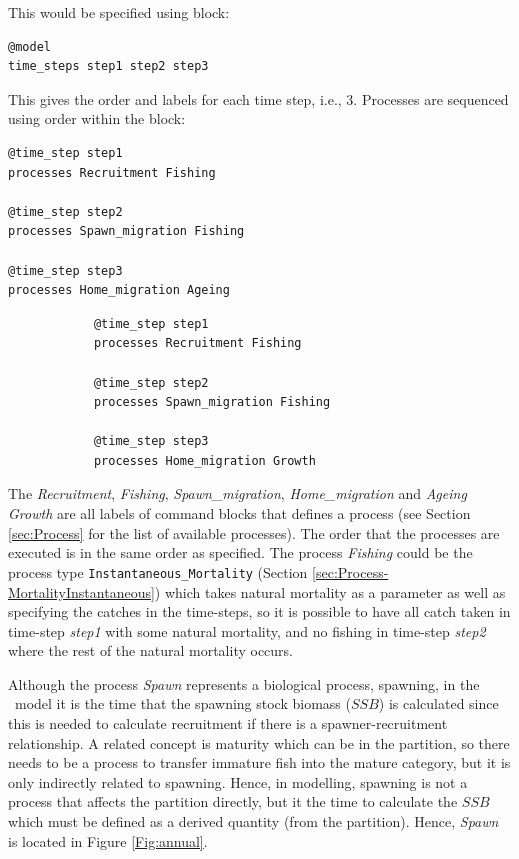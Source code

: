 This would be specified using  block:

{\small{\begin{verbatim}
@model
time_steps step1 step2 step3
\end{verbatim}}}

This gives the order and labels for each time step, i.e., 3. Processes are sequenced using order within the  block:

\ifAgeBased
{\small{\begin{verbatim}
@time_step step1
processes Recruitment Fishing

@time_step step2
processes Spawn_migration Fishing

@time_step step3
processes Home_migration Ageing
\end{verbatim}}}
\else
{\small{\begin{verbatim}
			@time_step step1
			processes Recruitment Fishing
			
			@time_step step2
			processes Spawn_migration Fishing
			
			@time_step step3
			processes Home_migration Growth
\end{verbatim}}}
\fi

The \emph{Recruitment}, \emph{Fishing}, \emph{Spawn\_migration}, \emph{Home\_migration} and \ifAgeBased \emph{Ageing} \else \emph{Growth} \fi are all labels of command blocks that defines a process (see Section \ref{sec:Process} for the list of available processes). The order that the  processes are executed is in the same order as specified. The process \emph{Fishing} could be the process type \texttt{Instantaneous\_Mortality} (Section \ref{sec:Process-MortalityInstantaneous}) which takes natural mortality as a parameter as well as specifying the catches in the time-steps, so it is possible to have all catch taken in time-step \emph{step1} with some natural mortality, and no fishing in time-step \emph{step2} where the rest of the natural mortality occurs.

Although the process \emph{Spawn} represents a biological process, spawning, in the \CNAME\ model it is the time that the spawning stock biomass ($SSB$) is calculated since this is needed to calculate recruitment if there is a spawner-recruitment relationship. A related concept is maturity which can be in the partition, so there needs to be a process to transfer immature fish into the mature category, but it is only indirectly related to spawning. Hence, in modelling, spawning is not a process that affects the partition directly, but it the time to calculate the $SSB$ which must be defined as a derived quantity (from the partition). Hence, \emph{Spawn} is located in Figure \ref{Fig:annual}.

